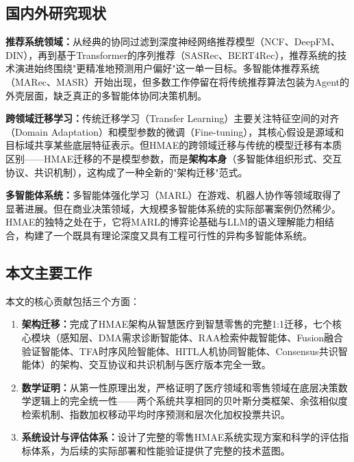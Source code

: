 \documentclass[11pt,a4paper]{ctexart}
\theoremstyle{remark}
\begin{document}
\subsection{国内外研究现状}

\textbf{推荐系统领域：}从经典的协同过滤\cite{cf_paper}到深度神经网络推荐模型（NCF\cite{ncf_paper}、DeepFM\cite{deepfm_paper}、DIN\cite{din_paper}），再到基于Transformer的序列推荐（SASRec\cite{sasrec_paper}、BERT4Rec\cite{bert4rec_paper}），推荐系统的技术演进始终围绕"更精准地预测用户偏好"这一单一目标。多智能体推荐系统（MARec\cite{marec_paper}、MASR\cite{masr_paper}）开始出现，但多数工作停留在将传统推荐算法包装为Agent的外壳层面，缺乏真正的多智能体协同决策机制。

\textbf{跨领域迁移学习：}传统迁移学习（Transfer Learning）主要关注特征空间的对齐（Domain Adaptation）和模型参数的微调（Fine-tuning），其核心假设是源域和目标域共享某些底层特征表示。但HMAE的跨领域迁移与传统的模型迁移有本质区别——HMAE迁移的不是模型参数，而是\textbf{架构本身}（多智能体组织形式、交互协议、共识机制），这构成了一种全新的"架构迁移"范式。

\textbf{多智能体系统：}多智能体强化学习（MARL）在游戏、机器人协作等领域取得了显著进展。但在商业决策领域，大规模多智能体系统的实际部署案例仍然稀少。HMAE的独特之处在于，它将MARL的博弈论基础与LLM的语义理解能力相结合，构建了一个既具有理论深度又具有工程可行性的异构多智能体系统。

\subsection{本文主要工作}

本文的核心贡献包括三个方面：

\begin{enumerate}[nosep]
\item \textbf{架构迁移：}完成了HMAE架构从智慧医疗到智慧零售的完整1:1迁移，七个核心模块（感知层、DMA需求诊断智能体、RAA检索仲裁智能体、Fusion融合验证智能体、TFA时序风险智能体、HITL人机协同智能体、Consensus共识智能体）的架构、交互协议和共识机制与医疗版本完全一致。
\item \textbf{数学证明：}从第一性原理出发，严格证明了医疗领域和零售领域在底层决策数学逻辑上的完全统一性——两个系统共享相同的贝叶斯分类框架、余弦相似度检索机制、指数加权移动平均时序预测和层次化加权投票共识。
\item \textbf{系统设计与评估体系：}设计了完整的零售HMAE系统实现方案和科学的评估指标体系，为后续的实际部署和性能验证提供了完整的技术蓝图。
\end{enumerate}
\end{document}

